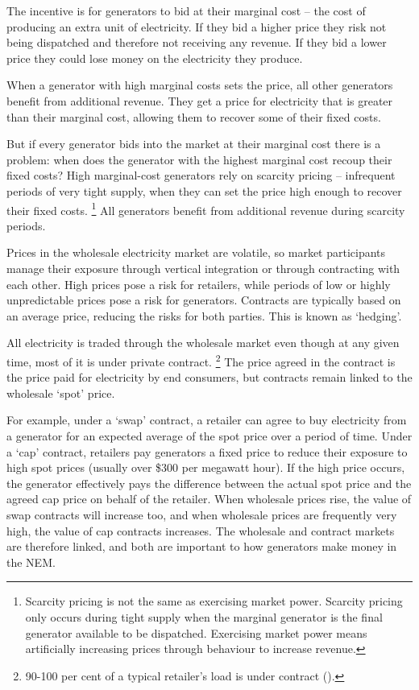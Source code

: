 \documentclass[FrontPage]{grattan}
\begin{document}
The incentive is for generators to bid at their marginal cost -- the cost of producing an extra unit of electricity. If they bid a higher price they risk not being dispatched and therefore not receiving any revenue. If they bid a lower price they could lose money on the electricity they produce.

When a generator with high marginal costs sets the price, all other generators benefit from additional revenue. They get a price for electricity that is greater than their marginal cost, allowing them to recover some of their fixed costs. 

But if every generator bids into the market at their marginal cost there is a problem: when does the generator with the highest marginal cost recoup their fixed costs? High marginal-cost generators rely on scarcity pricing -- infrequent periods of very tight supply, when they can set the price high enough to recover their fixed costs.%
\footnote{Scarcity pricing is not the same as exercising market power. Scarcity pricing only occurs during tight supply when the marginal generator is the final generator available to be dispatched. Exercising market power means artificially increasing prices through behaviour to increase revenue.}
All generators benefit from additional revenue during scarcity periods.

Prices in the wholesale electricity market are volatile, so market participants manage their exposure through vertical integration or through contracting with each other. High prices pose a risk for retailers, while periods of low or highly unpredictable prices pose a risk for generators. Contracts are typically based on an average price, reducing the risks for both parties. This is known as `hedging'.

All electricity is traded through the wholesale market even though at any given time, most of it is under private contract.%
\footnote{90-100 per cent of a typical retailer's load is under contract (\textcite{MEI2016ContractPosition}).}
The price agreed in the contract is the price paid for electricity by end consumers, but contracts remain linked to the wholesale `spot' price. 

For example, under a `swap' contract, a retailer can agree to buy electricity from a generator for an expected average of the spot price over a period of time. Under a `cap' contract, retailers pay generators a fixed price to reduce their exposure to high spot prices (usually over \$300 per megawatt hour). If the high price occurs, the generator effectively pays the difference between the actual spot price and the agreed cap price on behalf of the retailer. When wholesale prices rise, the value of swap contracts will increase too, and when wholesale prices are frequently very high, the value of cap contracts increases. The wholesale and contract markets are therefore linked, and both are important to how generators make money in the NEM\@.
\end{document}
